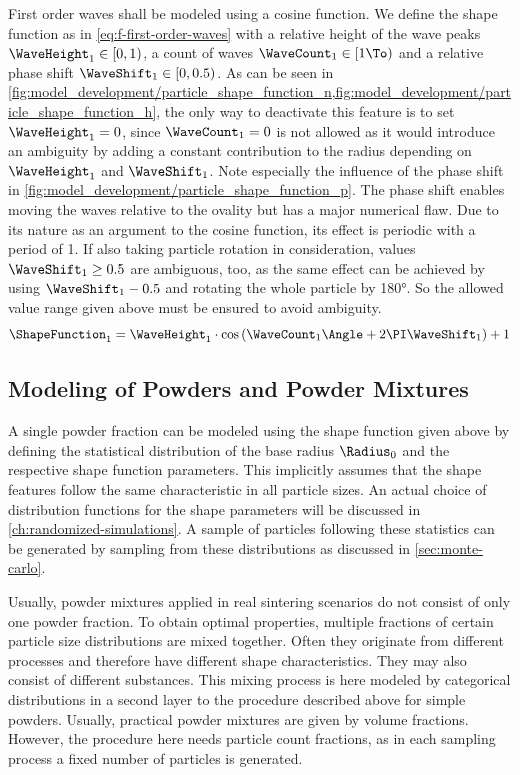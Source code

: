 First order waves shall be modeled using a cosine function.
We define the shape function as in \cref{eq:f-first-order-waves} with a relative height of the wave peaks $\WaveHeight_1 \in [0, 1)$, a count of waves $\WaveCount_1 \in [1 \To)$ and a relative phase shift $\WaveShift_1 \in [0, 0.5)$.
As can be seen in \cref{fig:model_development/particle_shape_function_n,fig:model_development/particle_shape_function_h},
the only way to deactivate this feature is to set $\WaveHeight_1=0$, since $\WaveCount_1=0$ is not allowed as it would introduce an ambiguity by adding a constant contribution to the radius depending on $\WaveHeight_1$ and $\WaveShift_1$.
Note especially the influence of the phase shift in \cref{fig:model_development/particle_shape_function_p}.
The phase shift enables moving the waves relative to the ovality but has a major numerical flaw.
Due to its nature as an argument to the cosine function, its effect is periodic with a period of \num{1}.
If also taking particle rotation in consideration, values $\WaveShift_1 \ge \num{0.5}$ are ambiguous, too, as the same effect can be achieved by using $\WaveShift_1 - \num{0.5}$ and rotating the whole particle by \ang{180}.
So the allowed value range given above must be ensured to avoid ambiguity.
\begin{equation}
    \ShapeFunction_1 = \WaveHeight_1 \cdot \cos \left( \WaveCount_1\Angle + 2\PI \WaveShift_1\right) + 1
    \label{eq:f-first-order-waves}
\end{equation}

\subsection{Modeling of Powders and Powder Mixtures}\label{subsec:powders-powder-mixtures}

A single powder fraction can be modeled using the shape function given above by defining the statistical distribution of the base radius $\Radius_0$ and the respective shape function parameters.
This implicitly assumes that the shape features follow the same characteristic in all particle sizes.
An actual choice of distribution functions for the shape parameters will be discussed in \cref{ch:randomized-simulations}.
A sample of particles following these statistics can be generated by sampling from these distributions as discussed in \cref{sec:monte-carlo}.

Usually, powder mixtures applied in real sintering scenarios do not consist of only one powder fraction.
To obtain optimal properties, multiple fractions of certain particle size distributions are mixed together.
Often they originate from different processes and therefore have different shape characteristics.
They may also consist of different substances.
This mixing process is here modeled by categorical distributions in a second layer to the procedure described above for simple powders.
Usually, practical powder mixtures are given by volume fractions.
However, the procedure here needs particle count fractions, as in each sampling process a fixed number of particles is generated.

